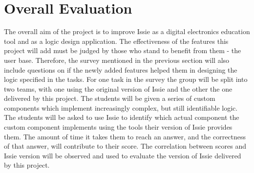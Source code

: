 \section{Overall Evaluation}
The overall aim of the project is to improve Issie as a digital electronics education tool and as a logic design application. The effectiveness of the features this project will add must be judged by those who stand to benefit from them - the user base. Therefore, the survey mentioned in the previous section will also include questions on if the newly added features helped them in designing the logic specified in the tasks. For one task in the survey the group will be split into two teams, with one using the original version of Issie and the other the one delivered by this project. The students will be given a series of custom components which implement increasingly complex, but still identifiable logic. The students will be asked to use Issie to identify which actual component the custom component implements using the tools their version of Issie provides them. The amount of time it takes them to reach an answer, and the correctness of that answer, will contribute to their score. The correlation between scores and Issie version will be observed and used to evaluate the version of Issie delivered by this project.